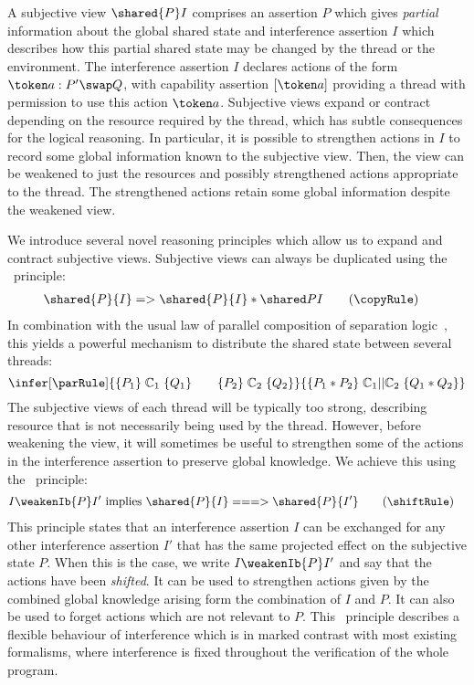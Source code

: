 A subjective view $\shared{P} I$ comprises an  assertion $P$ which gives {\em partial} information about the global shared state and interference assertion $I$ which describes how this partial shared state may be changed by the thread or the environment. The interference assertion $I$ declares actions of the form $\token a : P' \swap Q$, with capability assertion $[\token a]$ providing a thread with permission to use this action $\token a$. Subjective views expand or contract depending on the resource required by the thread, which has subtle consequences for the logical reasoning. In particular, it is possible to strengthen actions in $I$ to record  some global information known to the subjective view.
Then, the view can be weakened to just the resources and possibly strengthened actions appropriate to  the thread. The strengthened actions retain  some global information despite the weakened view. 

We introduce several novel reasoning principles which allow us to expand and contract subjective views. Subjective views can always be duplicated using the \copyRule\ principle:
%
\begin{align*}
  \label{eq:split}
  \shared{P}{I} &=> \shared{P}{I} * \shared P I \tag{\copyRule}
\end{align*}
%
%
In combination with the usual law of parallel composition of separation logic~\cite{csl-tcs}, this yields a powerful mechanism to distribute the shared state between several threads:
%
\[
\infer[\parRule]
	{
		\{P_1\} \;\mathbb{C}_1\; \{Q_1\}
		\qquad
		\{P_2\} \;\mathbb{C}_2\; \{Q_2\}
	}
	{
		\{P_1 * P_2\} \;\mathbb{C}_1 || \mathbb{C}_2\; \{Q_1 * Q_2\}		
	}
\]
%
The subjective views of each thread will be typically too strong, describing resource that is not necessarily being used by the thread. However, before  weakening the view, it will sometimes be useful to strengthen some of the actions in the interference assertion to preserve global knowledge. We achieve this using the \shiftRule\ principle:
%
\begin{align*}
  \label{eq:shift}
  I \weakenIb{P} I'
  &\text{ implies }
  \shared{P}{I} ===> \shared{P}{I'}
  \tag{\shiftRule}
\end{align*}
%
This principle states that an interference assertion $I$ can be exchanged for any other interference assertion $I'$ that has the same projected effect on the subjective state $P$. When this is the case, we write $I \weakenIb{P} I'$ and say that the actions have been  \emph{shifted}. It can be used to strengthen actions given by the combined global knowledge arising form the combination of $I$ and $P$. It can also be used to forget actions which are not relevant to $P$. This \shiftRule\ principle describes a flexible  behaviour of interference  which is in marked  contrast with most existing formalisms, where interference is fixed throughout the verification of the whole program.

